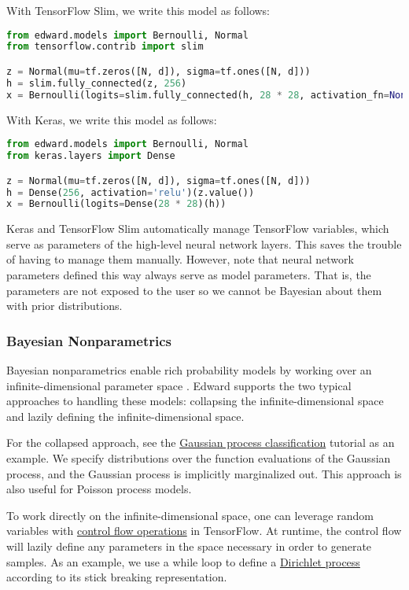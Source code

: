With TensorFlow Slim, we write this model as follows:

\begin{lstlisting}[language=python]
from edward.models import Bernoulli, Normal
from tensorflow.contrib import slim

z = Normal(mu=tf.zeros([N, d]), sigma=tf.ones([N, d]))
h = slim.fully_connected(z, 256)
x = Bernoulli(logits=slim.fully_connected(h, 28 * 28, activation_fn=None))
\end{lstlisting}

With Keras, we write this model as follows:

\begin{lstlisting}[language=python]
from edward.models import Bernoulli, Normal
from keras.layers import Dense

z = Normal(mu=tf.zeros([N, d]), sigma=tf.ones([N, d]))
h = Dense(256, activation='relu')(z.value())
x = Bernoulli(logits=Dense(28 * 28)(h))
\end{lstlisting}

Keras and TensorFlow Slim automatically manage TensorFlow variables, which
serve as parameters of the high-level neural network layers. This
saves the trouble of having to manage them manually. However, note
that neural network parameters defined this way always serve as model
parameters. That is, the parameters are not exposed to the user so we
cannot be Bayesian about them with prior distributions.

\subsubsection{Bayesian Nonparametrics}

Bayesian nonparametrics enable rich probability models by working over
an infinite-dimensional parameter space \citep{hjort2010bayesian}.
Edward supports the two typical approaches to handling these models:
collapsing the infinite-dimensional space and lazily defining the
infinite-dimensional space.

For the collapsed approach, see the
\href{/tutorials/gp-classification}{Gaussian process classification}
tutorial as an example. We specify distributions over the function
evaluations of the Gaussian process, and the Gaussian process is
implicitly marginalized out. This approach is also useful for Poisson
process models.

To work directly on the infinite-dimensional space, one can leverage
random variables with
\href{https://www.tensorflow.org/versions/master/api_docs/python/control_flow_ops.html}{control flow operations}
in TensorFlow. At runtime, the control flow will lazily define any
parameters in the space necessary in order to generate samples. As an
example, we use a while loop to define a
\href{https://github.com/blei-lab/edward/blob/master/examples/pp_dirichlet_process.py}
{Dirichlet process} according to its stick breaking representation.

